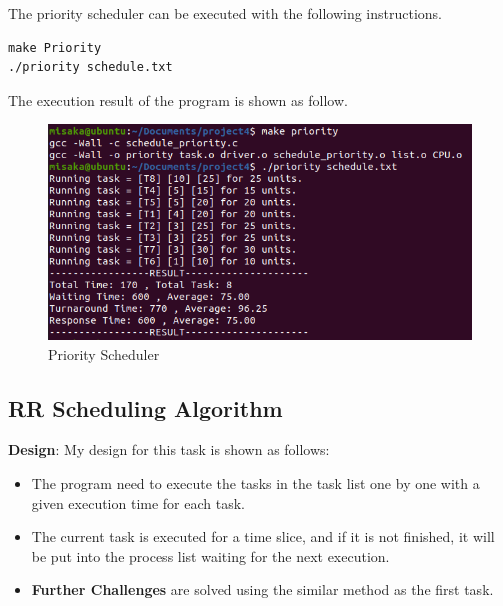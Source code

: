 \documentclass[UTF8,10pt,a4paper]{article}
\theoremstyle{Problem}
\theoremstyle{Solution}
\begin{document}
The priority scheduler can be executed with the following instructions.
\begin{lstlisting}
make Priority
./priority schedule.txt
\end{lstlisting}

The execution result of the program is shown as follow.

\begin{figure}[H]
    \centering
    \includegraphics[width=400pt]{4pri.png}
    \caption{Priority Scheduler}
    \label{3}
\end{figure}

\subsection{RR Scheduling Algorithm}

\textbf{Design}: My design for this task is shown as follows:

\begin{itemize}
    \item The program need to execute the tasks in the task list one by one with a given execution time for each task.
    \item The current task is executed for a time slice, and if it is not finished, it will be put into the process list waiting for the next execution.
    \item \textbf{Further Challenges} are solved using the similar method as the first task.
\end{itemize}
\end{document}
